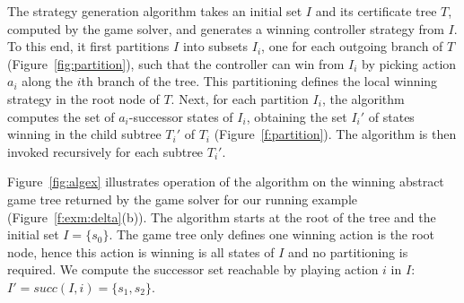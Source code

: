 The strategy generation algorithm takes an initial set $I$ and its certificate tree $T$, computed by the game solver, and generates a winning controller strategy from $I$.  To this end, it first partitions $I$ into subsets $I_i$, one for each outgoing branch of $T$ (Figure~\ref{fig:partition}), such that the controller can win from $I_i$ by picking action $a_i$ along the $i$th branch of the tree.  This partitioning defines the local winning strategy in the root node of $T$.  Next, for each partition $I_i$, the algorithm computes the set of $a_i$-successor states of $I_i$, obtaining the set $I_i'$ of states winning in the child subtree $T_i'$ of $T_i$ (Figure~\ref{f:partition}).  The algorithm is then 
invoked recursively for each subtree $T_i'$.

\begin{example}
Figure~\ref{fig:algex} illustrates operation of the algorithm on the winning abstract game tree returned by the game solver for our running example (Figure~\ref{f:exm:delta}(b)).  The algorithm starts at the root of the tree and the initial set $I=\{s_0\}$.  The game tree only defines one winning action is the root node, hence this action is winning is all states of $I$ and no partitioning is required.  We compute the successor set reachable by playing action $i$ in $I$: $I' = succ(I, i) = \{s_1, s_2\}$.



\end{example}
